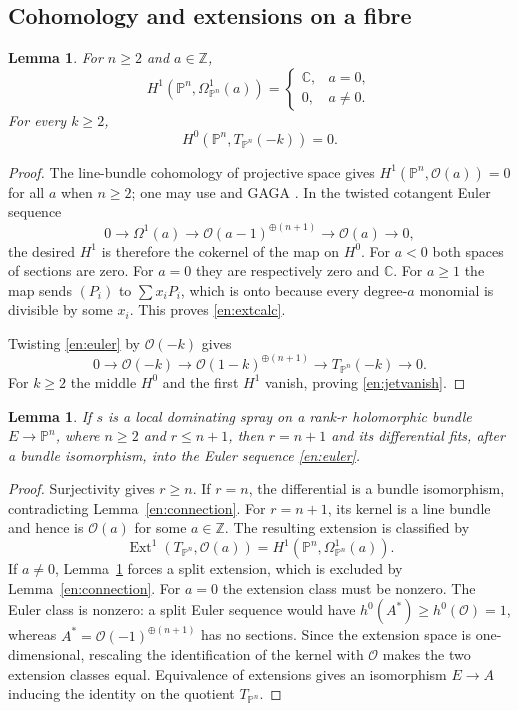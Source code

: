 \documentclass[12pt]{amsart}
\newtheorem{lem}[thm]{Lemma}
\theoremstyle{definition}
\theoremstyle{remark}
\numberwithin{equation}{section}
\newcommand{\cO}{\mathcal{O}}
\newcommand{\Z}{\mathbb{Z}}
\newcommand{\C}{\mathbb{C}}
\newcommand{\mP}{\mathbb{P}}
\DeclareMathOperator{\Ext}{Ext}
\begin{document}
\subsection{Cohomology and extensions on a fibre}
\begin{lem}\label{en:cohom}
For $n\geq2$ and $a\in\Z$,
\begin{equation}\label{en:extcalc}
H^1(\mP^n,\Omega^1_{\mP^n}(a))=
\begin{cases}\C,&a=0,\\0,&a\ne0.\end{cases}
\end{equation}
For every $k\geq2$,
\begin{equation}\label{en:jetvanish}
H^0(\mP^n,T_{\mP^n}(-k))=0.
\end{equation}
\end{lem}
\begin{proof}
The line-bundle cohomology of projective space gives $H^1(\mP^n,\cO(a))=0$ for all $a$ when $n\geq2$; one may use \cite[Lemma~30.8.1]{en:Stacks} and GAGA \cite{en:Serre}. In the twisted cotangent Euler sequence
\[
0\longrightarrow\Omega^1(a)\longrightarrow
\cO(a-1)^{\oplus(n+1)}\longrightarrow\cO(a)\longrightarrow0,
\]
the desired $H^1$ is therefore the cokernel of the map on $H^0$. For $a<0$ both spaces of sections are zero. For $a=0$ they are respectively zero and $\C$. For $a\geq1$ the map sends $(P_i)$ to $\sum x_iP_i$, which is onto because every degree-$a$ monomial is divisible by some $x_i$. This proves \eqref{en:extcalc}.

Twisting \eqref{en:euler} by $\cO(-k)$ gives
\[
0\longrightarrow\cO(-k)\longrightarrow
\cO(1-k)^{\oplus(n+1)}\longrightarrow T_{\mP^n}(-k)\longrightarrow0.
\]
For $k\geq2$ the middle $H^0$ and the first $H^1$ vanish, proving \eqref{en:jetvanish}.
\end{proof}

\begin{lem}\label{en:fibreclass}
If $s$ is a local dominating spray on a rank-$r$ holomorphic bundle $E\to\mP^n$, where $n\geq2$ and $r\leq n+1$, then $r=n+1$ and its differential fits, after a bundle isomorphism, into the Euler sequence \eqref{en:euler}.
\end{lem}
\begin{proof}
Surjectivity gives $r\geq n$. If $r=n$, the differential is a bundle isomorphism, contradicting Lemma~\ref{en:connection}. For $r=n+1$, its kernel is a line bundle and hence is $\cO(a)$ for some $a\in\Z$. The resulting extension is classified by
\[
\Ext^1(T_{\mP^n},\cO(a))
=H^1(\mP^n,\Omega^1_{\mP^n}(a)).
\]
If $a\ne0$, Lemma~\ref{en:cohom} forces a split extension, which is excluded by Lemma~\ref{en:connection}. For $a=0$ the extension class must be nonzero. The Euler class is nonzero: a split Euler sequence would have $h^0(A^*)\geq h^0(\cO)=1$, whereas $A^*=\cO(-1)^{\oplus(n+1)}$ has no sections. Since the extension space is one-dimensional, rescaling the identification of the kernel with $\cO$ makes the two extension classes equal. Equivalence of extensions gives an isomorphism $E\to A$ inducing the identity on the quotient $T_{\mP^n}$.
\end{proof}
\end{document}

